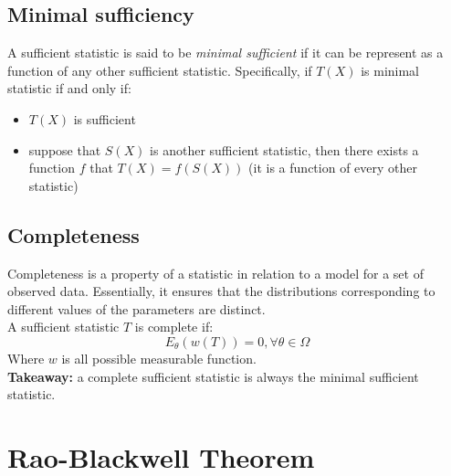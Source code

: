 \documentclass[12pt ]{article}
\begin{document}
\subsection{Minimal sufficiency}
A sufficient statistic is said to be \textit{minimal sufficient} if it can be represent as a function of any other sufficient statistic. Specifically, if $T(X)$ is minimal statistic if and only if:
\begin{itemize}
\item $T(X)$ is sufficient
\item suppose that $S(X)$ is another sufficient statistic, then there exists a function $f$ that $T(X) = f(S(X))$ (it is a function of every other statistic)
\end{itemize}

\subsection{Completeness}
Completeness is a property of a statistic in relation to a model for a set of observed data. Essentially, it ensures that the distributions corresponding to different values of the parameters are distinct.\\
A sufficient statistic $T$ is complete if:
\begin{equation}
E_{\theta}(w(T)) = 0, \forall \theta \in \Omega
\end{equation}
Where $w$ is all possible measurable function.\\
\textbf{Takeaway:} a complete sufficient statistic is always the minimal sufficient statistic.

\section{Rao-Blackwell Theorem}
\end{document}
